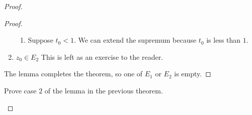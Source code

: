 \documentclass[notes]{subfile}
\begin{document}
\begin{proof}
\begin{proof}
\begin{enumerate}
\begin{enumerate}
                    \item Suppose $t_0 < 1$.
                        We can extend the supremum because $t_0$
                        is less than $1$.
                \end{enumerate}

            \item $z_0 \in E_2$
                This is left as an exercise to the reader.
        \end{enumerate}

        The lemma completes the theorem, so one of $E_1$
        or $E_2$ is empty.

    \end{proof}

    \begin{exercise}
        Prove case $2$ of the lemma in the previous theorem.
    \end{exercise}
    

\end{proof}
\end{document}

